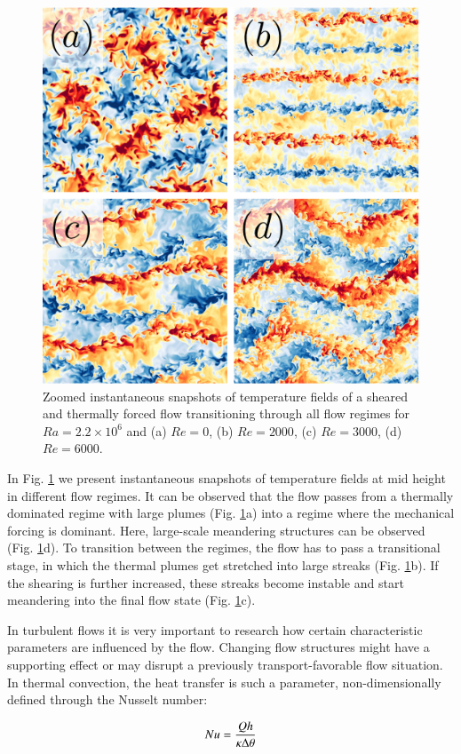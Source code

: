 \documentclass[final,5p,times,twocolumn]{elsarticle}
\begin{document}
\begin{figure}
	\centering
	\includegraphics[width=0.8\linewidth]{squaredoverview}%
	\caption{\label{fig:overview} Zoomed instantaneous snapshots of temperature fields
of a sheared and thermally forced flow transitioning through all flow regimes
for $ Ra=2.2 \times 10^6 $ and (a) $ Re=0 $, (b) $ Re=2000 $, (c) $ Re=3000 $, (d) $ Re=6000 $.}
\end{figure}

In Fig. \ref{fig:overview} we present instantaneous snapshots of temperature
fields at mid height in different flow regimes. It can be observed that the flow passes from a
thermally dominated regime with large plumes (Fig. \ref{fig:overview}a) into a
regime where the mechanical forcing is dominant. Here, large-scale meandering
structures can be observed (Fig. \ref{fig:overview}d). To transition between the
regimes, the flow has to pass a transitional stage, in which the thermal plumes
get stretched into large streaks (Fig. \ref{fig:overview}b). If the shearing is
further increased, these streaks become instable and start meandering into the
final flow state (Fig. \ref{fig:overview}c).

In turbulent flows it is very important to research how certain characteristic
parameters are influenced by the flow. Changing flow structures might have a
supporting effect or may disrupt a previously transport-favorable flow situation. 
In thermal convection, the heat transfer is such a parameter, non-dimensionally
defined through the Nusselt number:

\begin{equation} %
Nu= \frac{Qh}{\kappa \Delta \theta}
\label{eqn:nusselt} \\[8pt]
\end{equation} 
\end{document}
